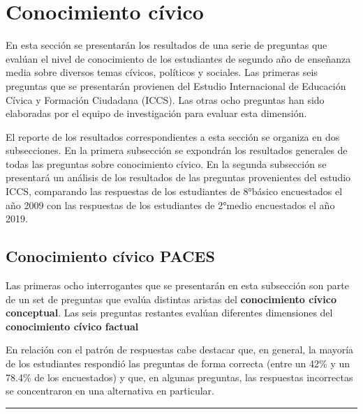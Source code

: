 \documentclass[
  14pt,
]{book}
\begin{document}
\hypertarget{conocimiento-cuxedvico}{%
\section{Conocimiento cívico}\label{conocimiento-cuxedvico}}

En esta sección se presentarán los resultados de una serie de preguntas que evalúan el nivel de conocimiento de los estudiantes de segundo año de enseñanza media sobre diversos temas cívicos, políticos y sociales. Las primeras seis preguntas que se presentarán provienen del Estudio Internacional de Educación Cívica y Formación Ciudadana (ICCS). Las otras ocho preguntas han sido elaboradas por el equipo de investigación para evaluar esta dimensión.

El reporte de los resultados correspondientes a esta sección se organiza en dos subsecciones. En la primera subsección se expondrán los resultados generales de todas las preguntas sobre conocimiento cívico. En la segunda subsección se presentará un análisis de los resultados de las preguntas provenientes del estudio ICCS, comparando las respuestas de los estudiantes de 8°básico encuestados el año 2009 con las respuestas de los estudiantes de 2°medio encuestados el año 2019.

\hypertarget{conocimiento-cuxedvico-paces}{%
\subsection{Conocimiento cívico PACES}\label{conocimiento-cuxedvico-paces}}

Las primeras ocho interrogantes que se presentarán en esta subsección son parte de un set de preguntas que evalúa distintas aristas del \textbf{conocimiento cívico conceptual}. Las seis preguntas restantes evalúan diferentes dimensiones del \textbf{conocimiento cívico factual}

En relación con el patrón de respuestas cabe destacar que, en general, la mayoría de los estudiantes respondió las preguntas de forma correcta (entre un 42\% y un 78.4\% de los encuestados) y que, en algunas preguntas, las respuestas incorrectas se concentraron en una alternativa en particular.

\begin{center}\rule{0.5\linewidth}{0.5pt}\end{center}
\end{document}
